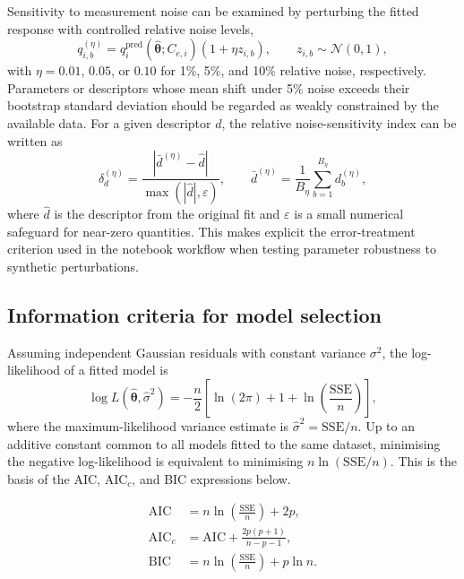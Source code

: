 \documentclass[journal=aamick,manuscript=article]{achemso}
\begin{document}
Sensitivity to measurement noise can be examined by perturbing the
fitted response with controlled relative noise levels,
\begin{equation}
	q_{i,b}^{(\eta)}
	=
	q_i^{\mathrm{pred}}(\hat{\boldsymbol{\theta}}; C_{e,i})
	\left(1 + \eta z_{i,b}\right),
	\qquad
	z_{i,b} \sim \mathcal{N}(0,1),
	\label{eq:si_noise_test}
\end{equation}
with $\eta = 0.01$, $0.05$, or $0.10$ for 1\%, 5\%, and 10\% relative
noise, respectively. Parameters or descriptors whose mean shift under
5\% noise exceeds their bootstrap standard deviation should be regarded
as weakly constrained by the available data.
For a given descriptor $d$, the relative noise-sensitivity index can be
written as
\begin{equation}
	\delta_d^{(\eta)}
	=
	\frac{
	\left|
	\bar{d}^{(\eta)} - \hat{d}
	\right|
	}{
	\max\!\left(|\hat{d}|,\varepsilon\right)
	},
	\qquad
	\bar{d}^{(\eta)} = \frac{1}{B_{\eta}}\sum_{b=1}^{B_{\eta}} d_b^{(\eta)},
	\label{eq:si_noise_shift}
\end{equation}
where $\hat{d}$ is the descriptor from the original fit and
$\varepsilon$ is a small numerical safeguard for near-zero quantities.
This makes explicit the error-treatment criterion used in the notebook
workflow when testing parameter robustness to synthetic perturbations.

\subsection{Information criteria for model selection}
\label{sec:si_information_criteria}

Assuming independent Gaussian residuals with constant variance
$\sigma^2$, the log-likelihood of a fitted model is
\begin{equation}
	\log L(\hat{\boldsymbol{\theta}}, \hat{\sigma}^2)
	=
	-\frac{n}{2}
	\left[
	\ln(2\pi)
	+ 1
	+ \ln\!\left(\frac{\mathrm{SSE}}{n}\right)
	\right],
	\label{eq:si_loglik}
\end{equation}
where the maximum-likelihood variance estimate is
$\hat{\sigma}^2 = \mathrm{SSE}/n$. Up to an additive constant common to
all models fitted to the same dataset, minimising the negative
log-likelihood is equivalent to minimising
$n\ln(\mathrm{SSE}/n)$. This is the basis of the AIC, AIC$_c$, and BIC
expressions below.

\begin{align}
	\text{AIC}   &= n\ln\!\left(\frac{\mathrm{SSE}}{n}\right) + 2p,
	\label{eq:si_AIC} \\[4pt]
	\text{AIC}_c &= \text{AIC} + \frac{2p(p+1)}{n-p-1},
	\label{eq:si_AICc} \\[4pt]
	\text{BIC}   &= n\ln\!\left(\frac{\mathrm{SSE}}{n}\right) + p\ln n.
	\label{eq:si_BIC}
\end{align}
\end{document}
